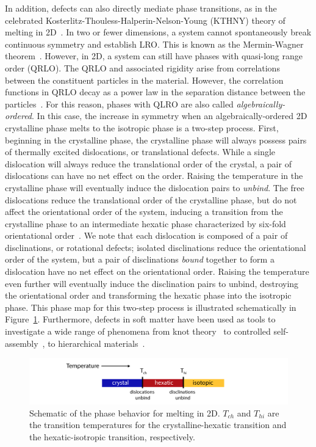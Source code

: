 In addition, defects can also directly mediate phase transitions, as in the celebrated Kosterlitz-Thouless-Halperin-Nelson-Young (KTHNY) theory of melting in 2D~\cite{RN161,RN162,RN163}.
In two or fewer dimensions, a system cannot spontaneously break continuous symmetry and establish LRO.
This is known as the Mermin-Wagner theorem~\cite{RN175}.
However, in 2D, a system can still have phases with quasi-long range order (QRLO).
The QRLO and associated rigidity arise from correlations between the constituent particles in the material.
However, the correlation functions in QRLO decay as a power law in the separation distance between the particles~\cite{RN175}.
For this reason, phases with QLRO are also called \emph{algebraically-ordered}.
In this case, the increase in symmetry when an algebraically-ordered 2D crystalline phase melts to the isotropic phase is a two-step process.
First, beginning in the crystalline phase, the crystalline phase will always possess pairs of thermally excited dislocations, or translational defects.
While a single dislocation will always reduce the translational order of the crystal, a pair of dislocations can have no net effect on the order.
Raising the temperature in the crystalline phase will eventually induce the dislocation pairs to \emph{unbind}.
The free dislocations reduce the translational order of the crystalline phase, but do not affect the orientational order of the system, inducing a transition from the crystalline phase to an intermediate hexatic phase characterized by six-fold orientational order~\cite{RN61,RN203}.
We note that each dislocation is composed of a pair of disclinations, or rotational defects; isolated disclinations reduce the orientational order of the system, but a pair of disclinations \emph{bound} together to form a dislocation have no net effect on the orientational order.
Raising the temperature even further will eventually induce the disclination pairs to unbind, destroying the orientational order and transforming the hexatic phase into the isotropic phase.
This phase map for this two-step process is illustrated schematically in Figure~\ref{f:1-KTHNY}.
Furthermore, defects in soft matter have been used as tools to investigate a wide range of phenomena from knot theory~\cite{RN156,RN277} to controlled self-assembly~\cite{RN43,RN50,RN150,RN157}, to hierarchical materials~\cite{RN164,RN159,RN27}.
\begin{figure}
  \centering
  \includegraphics{figures/C1/Ch1-Figs_KTHNY.png}
  \caption{Schematic of the phase behavior for melting in 2D.
  $T_{ch}$ and $T_{hi}$ are the transition temperatures for the crystalline-hexatic transition and the hexatic-isotropic transition, respectively.
  }\label{f:1-KTHNY}
\end{figure}


